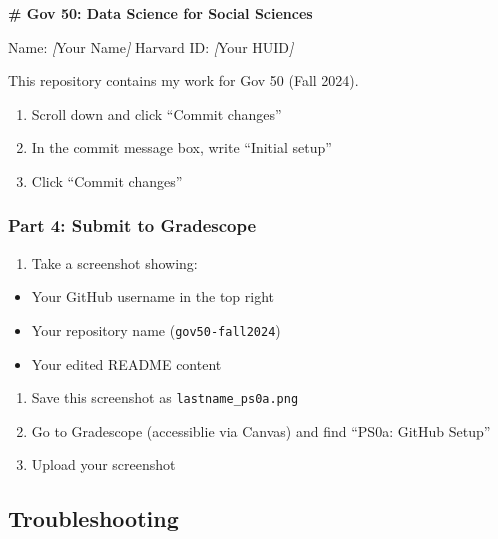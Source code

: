 \documentclass[
  11pt,
  letterpaper]{article}
\newenvironment{Shaded}{\begin{snugshade}}{\end{snugshade}}
\newcommand{\CommentTok}[1]{\textcolor[rgb]{0.56,0.35,0.01}{\textit{#1}}}
\newcommand{\FunctionTok}[1]{\textcolor[rgb]{0.13,0.29,0.53}{\textbf{#1}}}
\newcommand{\NormalTok}[1]{#1}
\newcommand{\OtherTok}[1]{\textcolor[rgb]{0.56,0.35,0.01}{#1}}
\providecommand{\tightlist}{%
  \setlength{\itemsep}{0pt}\setlength{\parskip}{0pt}}
\begin{document}
\begin{Shaded}
\begin{Highlighting}[]
\FunctionTok{\# Gov 50: Data Science for Social Sciences}

\NormalTok{Name: }\CommentTok{[}\OtherTok{Your Name}\CommentTok{]}
\NormalTok{Harvard ID: }\CommentTok{[}\OtherTok{Your HUID}\CommentTok{]}

\NormalTok{This repository contains my work for Gov 50 (Fall 2024).}
\end{Highlighting}
\end{Shaded}

\begin{enumerate}
\def\labelenumi{\arabic{enumi}.}
\setcounter{enumi}{3}
\tightlist
\item
  Scroll down and click ``Commit changes''
\item
  In the commit message box, write ``Initial setup''
\item
  Click ``Commit changes''
\end{enumerate}

\subsubsection{Part 4: Submit to
Gradescope}\label{part-4-submit-to-gradescope}

\begin{enumerate}
\def\labelenumi{\arabic{enumi}.}
\tightlist
\item
  Take a screenshot showing:
\end{enumerate}

\begin{itemize}
\tightlist
\item
  Your GitHub username in the top right
\item
  Your repository name (\texttt{gov50-fall2024})
\item
  Your edited README content
\end{itemize}

\begin{enumerate}
\def\labelenumi{\arabic{enumi}.}
\setcounter{enumi}{1}
\tightlist
\item
  Save this screenshot as \texttt{lastname\_ps0a.png}
\item
  Go to Gradescope (accessiblie via Canvas) and find ``PS0a: GitHub
  Setup''
\item
  Upload your screenshot
\end{enumerate}

\subsection{Troubleshooting}\label{troubleshooting}
\end{document}
